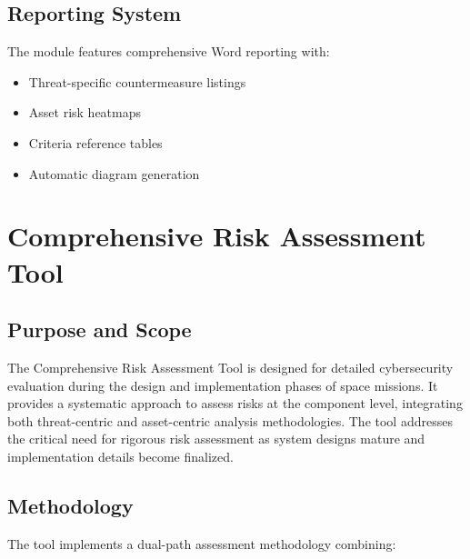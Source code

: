 \documentclass[binding=0.6cm]{sapthesis}
\begin{document}
\subsection{Reporting System}

The module features comprehensive Word reporting with:

\begin{itemize}
    \item Threat-specific countermeasure listings
    \item Asset risk heatmaps
    \item Criteria reference tables
    \item Automatic diagram generation
\end{itemize}

\section{Comprehensive Risk Assessment Tool}

\subsection{Purpose and Scope}

The Comprehensive Risk Assessment Tool is designed for detailed cybersecurity evaluation during the design and implementation phases of space missions. It provides a systematic approach to assess risks at the component level, integrating both threat-centric and asset-centric analysis methodologies. The tool addresses the critical need for rigorous risk assessment as system designs mature and implementation details become finalized.

\subsection{Methodology}

The tool implements a dual-path assessment methodology combining:
\end{document}
